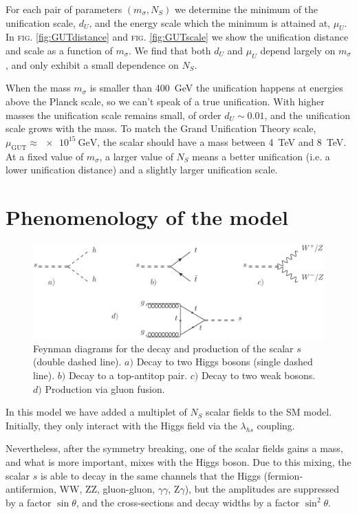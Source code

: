 \documentclass[aps,prd,preprintnumbers,nofootinbibn,twocolumn]{revtex4}
\begin{document}
For each pair of parameters $(m_\sigma, N_S)$ we determine the minimum of the unification scale, $d_U$, and the energy scale which the minimum is attained at, $\mu_U$.  In \textsc{fig.} \ref{fig:GUTdistance} and \textsc{fig.} \ref{fig:GUTscale} we show the unification distance and scale as a function of $m_\sigma$. We find that both $d_U$ and $\mu_U$ depend largely on $m_\sigma$, and only exhibit a small dependence on $N_S$.


When the mass $m_\sigma$ is smaller than \SI{400}{\giga\electronvolt} the unification happens at energies above the Planck scale, so we can't speak of a true unification. With higher masses the unification scale remains small, of order $d_U \sim 0.01$, and the unification scale grows with the mass. To match the Grand Unification Theory scale, $\mu_{\mathrm{GUT}}\approx \SI{e15}{\giga\electronvolt}$, the scalar should have a mass between \SI{4}{\tera\electronvolt} and \SI{8}{\tera\electronvolt}. At a fixed value of $m_\sigma$, a larger value of $N_S$ means a better unification (i.e. a lower unification distance) and a slightly larger unification scale. 

\section{Phenomenology of the model}\label{sect:pheno}
\begin{figure}[b]
\centering
\includegraphics[width=\columnwidth]{diagrams}
\caption{Feynman diagrams for the decay and production of the scalar $s$ (double dashed line). $a)$ Decay to two Higgs bosons (single dashed line). $b)$ Decay to a top-antitop pair. $c)$ Decay to two weak bosons. $d)$ Production via gluon fusion.}\label{fig:diagrams}
\end{figure}

In this model we have added a multiplet of $N_S$ scalar fields to the SM model. Initially, they only interact with the Higgs field via the $\lambda_{hs}$ coupling.

Nevertheless, after the symmetry breaking, one of the scalar fields gains a mass, and what is more important, mixes with the Higgs boson. Due to this mixing, the scalar $s$ is able to decay in the same channels that the Higgs (fermion-antifermion, WW, ZZ,  gluon-gluon, $\gamma\gamma$, Z$\gamma$), but the amplitudes are suppressed by a factor $\sin \theta$, and the cross-sections and decay widths by a factor $\sin^2\theta$. 
\end{document}
